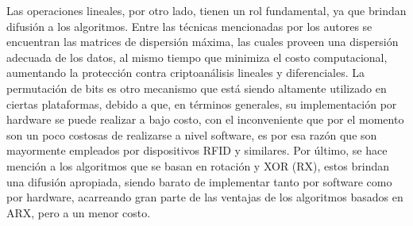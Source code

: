 \documentclass[a4paper,10pt]{article}
\begin{document}
	Las operaciones lineales, por otro lado, tienen un rol fundamental, ya que brindan difusión a los algoritmos. Entre las técnicas mencionadas por los autores se encuentran las matrices de dispersión máxima, las cuales proveen una dispersión adecuada de los datos, al mismo tiempo que minimiza el costo computacional, aumentando la protección contra criptoanálisis lineales y diferenciales. La permutación de bits es otro mecanismo que está siendo altamente utilizado en ciertas plataformas, debido a que, en términos generales, su implementación por hardware se puede realizar a bajo costo, con el inconveniente que por el momento son un poco costosas de realizarse a nivel software, es por esa razón que son mayormente empleados por dispositivos RFID y similares. Por último, se hace mención a los algoritmos que se basan en rotación y XOR (RX), estos brindan una difusión apropiada, siendo barato de implementar tanto por software como por hardware, acarreando gran parte de las ventajas de los algoritmos basados en ARX, pero a un menor costo.
	
\end{document}
